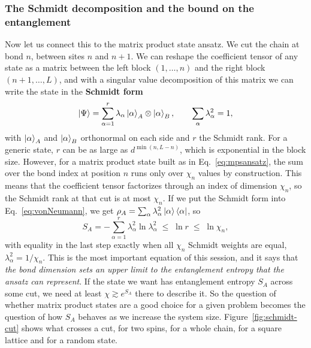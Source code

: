 \documentclass[lecture_notes.tex]{subfiles}
\begin{document}
\subsubsection{The Schmidt decomposition and the bound on the entanglement}
Now let us connect this to the matrix product state ansatz. We cut the chain at bond $n$, between
sites $n$ and $n+1$. We can reshape the coefficient tensor of any state as a matrix between the
left block $(1,\ldots,n)$ and the right block $(n+1,\ldots,L)$, and with a singular value
decomposition of this matrix we can write the state in the \textbf{Schmidt form}
\begin{equation}
  \ket{\Psi} = \sum_{\alpha=1}^{r} \lambda_\alpha \ket{\alpha}_A \otimes \ket{\alpha}_B,
  \qquad \sum_\alpha \lambda_\alpha^2 = 1,
  \label{eq:schmidt}
\end{equation}
with $\ket{\alpha}_A$ and $\ket{\alpha}_B$ orthonormal on each side and $r$ the Schmidt rank. For
a generic state, $r$ can be as large as $d^{\min(n,L-n)}$, which is exponential in the block size.
However, for a matrix product state built as in Eq.~\eqref{eq:mpsansatz}, the sum over the bond
index at position $n$ runs only over $\chi_n$ values by construction. This means that the
coefficient tensor factorizes through an index of dimension $\chi_n$, so the Schmidt rank at that
cut is at most $\chi_n$. If we put the Schmidt form into Eq.~\eqref{eq:vonNeumann}, we get
$\rho_A = \sum_\alpha \lambda_\alpha^2 \ket{\alpha}\bra{\alpha}$, so
\begin{equation}
  S_A = -\sum_{\alpha=1}^{r} \lambda_\alpha^2 \ln \lambda_\alpha^2 \;\le\; \ln r \;\le\; \ln \chi_n,
  \label{eq:arealawbound}
\end{equation}
with equality in the last step exactly when all $\chi_n$ Schmidt weights are equal,
$\lambda_\alpha^2 = 1/\chi_n$. This is the most important equation of this session, and it says
that \emph{the bond dimension sets an upper limit to the entanglement entropy that the ansatz can
represent}. If the state we want has entanglement entropy $S_A$ across some cut, we need at least
$\chi \gtrsim e^{S_A}$ there to describe it. So the question of whether matrix product states are
a good choice for a given problem becomes the question of how $S_A$ behaves as we increase the
system size. Figure~\ref{fig:schmidt-cut} shows what crosses a cut, for two spins, for a whole
chain, for a square lattice and for a random state.
\end{document}
